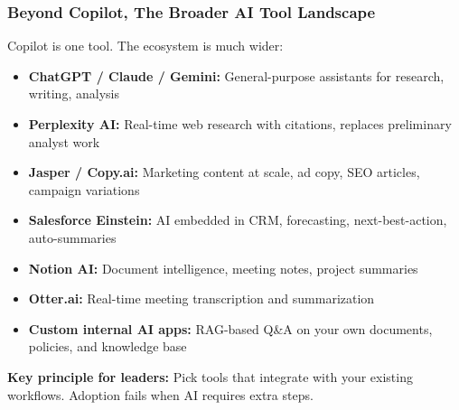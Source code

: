 \begin{frame}[fragile]\frametitle{Beyond Copilot, The Broader AI Tool Landscape}

Copilot is one tool. The ecosystem is much wider:
\begin{itemize}
  \item \textbf{ChatGPT / Claude / Gemini:} General-purpose assistants for research, writing, analysis
  \item \textbf{Perplexity AI:} Real-time web research with citations, replaces preliminary analyst work
  \item \textbf{Jasper / Copy.ai:} Marketing content at scale, ad copy, SEO articles, campaign variations
  \item \textbf{Salesforce Einstein:} AI embedded in CRM, forecasting, next-best-action, auto-summaries
  \item \textbf{Notion AI:} Document intelligence, meeting notes, project summaries
  \item \textbf{Otter.ai:} Real-time meeting transcription and summarization
  \item \textbf{Custom internal AI apps:} RAG-based Q\&A on your own documents, policies, and knowledge base
\end{itemize}

\textbf{Key principle for leaders:} Pick tools that integrate with your existing workflows. Adoption fails when AI requires extra steps.

\end{frame}

